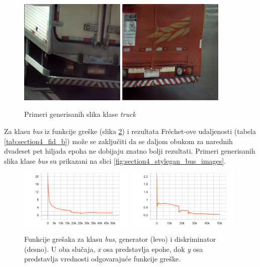 \documentclass[12pt,oneside]{memoir}
\begin{document}
\begin{figure}[!htbp]
\centering
    \includegraphics[width=0.45\textwidth]{matfmaster/stylegan/truck/image0.png}
    \includegraphics[width=0.45\textwidth]{matfmaster/stylegan/truck/image6.png}
\caption{Primeri generisanih slika klase \textit{truck}}
\label{fig:section4_stylegan_truck_images}
\end{figure}


\clearpage
Za klasu \textit{bus} iz funkcije greške (slika \ref{fig:section4_stylegan_bus_loss}) i rezultata Fréchet-ove udaljenosti (tabela \ref{tab:section4_fid_b}) može se zaključiti da se daljom obukom za narednih dvadeset pet hiljada epoha ne dobijaju znatno bolji rezultati. Primeri generisanih slika klase \textit{bus} su prikazani na slici \ref{fig:section4_stylegan_bus_images}.


\begin{figure}[!htbp]
\centering
  \includegraphics[width=0.49\textwidth]{matfmaster/stylegan/bus/g_loss.png}
  \includegraphics[width=0.49\textwidth]{matfmaster/stylegan/bus/d_loss.png}
\caption{Funkcije grešaka za klasu \textit{bus}, generator (levo) i diskriminator (desno). U oba slučaja, \textit{x} osa predstavlja epohe, dok \textit{y} osa predstavlja vrednosti odgovarajuće funkcije greške.}\label{fig:section4_stylegan_bus_loss}
\end{figure}
\end{document}
